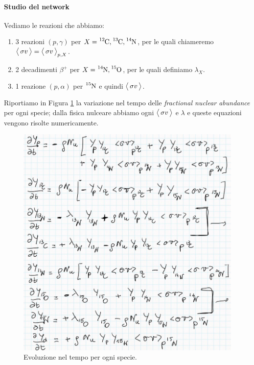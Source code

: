 \paragraph{Studio del network} 
Vediamo le reazioni che abbiamo:
\begin{enumerate}
	\item 3 reazioni $(p,\gamma)$ per $X = \ce{^{12}C},\ce{^{13}C},\ce{^{14}N}$, per le quali chiameremo $\bigl\langle\, \sigma v\, \bigr\rangle = \bigl\langle\, \sigma v\, \bigr\rangle_{p,X}$.
	\item 2 decadimenti $\beta^+$ per $X = \ce{^{14}N},\ce{^{15}O}$, per le quali definiamo $\lambda_X$.
	\item 1 reazione $(p,\alpha)$ per $\ce{^{15}N}$ e quindi $\bigl\langle\, \sigma v\, \bigr\rangle$.
\end{enumerate}
Riportiamo in Figura \ref{0422_reaz} la variazione nel tempo delle \textit{fractional nuclear abundance} per ogni specie; dalla fisica nulceare abbiamo ogni $\bigl\langle\, \sigma v\, \bigr\rangle$ e $\lambda$ e queste equazioni vengono risolte numericamente.

\begin{figure}[!h]
	\centering
	\includegraphics[scale=0.5]{Immagini/0422_reazioni.png}
	\caption{Evoluzione nel tempo per ogni specie.}
	\label{0422_reaz}
\end{figure}

